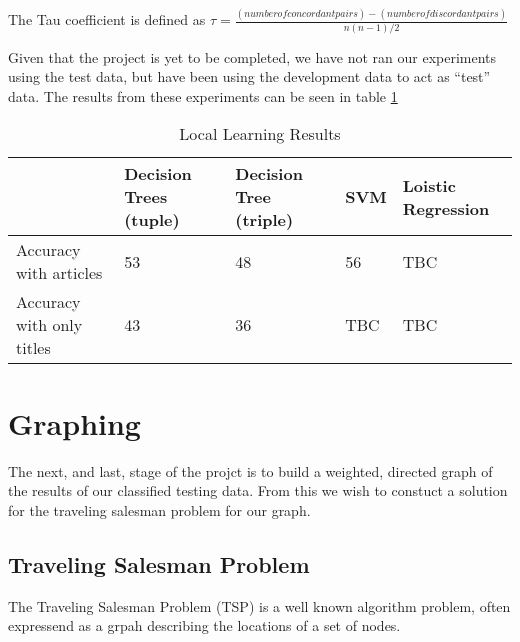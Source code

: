 \documentclass[12pt]{report}
\begin{document}
The Tau coefficient is defined as $\tau = \frac{(number of concordant pairs) - (number of discordant pairs)}{n(n-1)/2}$\cite{kendalltau}%

Given that the project is yet to be completed, we have not ran our experiments using the test data, but have been using
the development data to act as ``test'' data. The results from these experiments can be seen in table \ref{table:local-learning}

\begin{table}[h]
\centering
\label{table:local-learning}
\begin{tabular}{|l|l|l|l|l}
  \hline
                          & Decision Trees (tuple) & Decision Tree (triple) & SVM  & Loistic Regression\\
  \hline
Accuracy with articles    & 53                      & 48                      & 56 &  TBC\\
\hline
Accuracy with only titles & 43                      & 36                      & TBC    & TBC\\
\hline
\end{tabular}
\caption{Local Learning Results}
\end{table}



\chapter{Graphing}
The next, and last, stage of the projct is to build a weighted, directed graph of the
results of our classified testing data. From this we wish to constuct a solution for
the traveling salesman problem for our graph.

\section{Traveling Salesman Problem}
The Traveling Salesman Problem (TSP) is a well known algorithm problem, often expressend as a grpah
describing the locations of a set of nodes.
\end{document}

